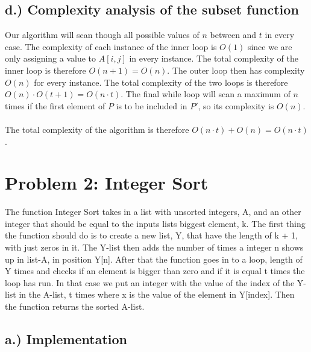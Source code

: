 \documentclass{article}
\begin{document}
\subsection*{d.) Complexity analysis of the subset function}
Our algorithm will scan though all possible values of $n$ between and $t$ in every case. The complexity of each instance of the inner loop is $O(1)$ since we are only assigning a value to $A[i,j]$ in every instance. The total complexity of the inner loop is therefore $O(n+1) = O(n)$.
The outer loop then has complexity $O(n)$ for every instance. The total complexity of the two loops is therefore $O(n)\cdot O(t+1) = O(n\cdot t)$. The final while loop will scan a maximum of $n$ times if the first element of $P$ is to be included in $P'$, so its complexity is $O(n)$. \\ \\The total complexity of the algorithm is therefore $O(n\cdot t) + O(n) = O(n\cdot t)$.
\section*{Problem 2: Integer Sort}
The function Integer Sort takes in a list with unsorted integers, A, and an other integer that should be equal to the inputs lists biggest element, k. The first thing the function should do is to create a new list, Y, that have the length of k + 1, with just zeros in it. The Y-list then adds the number of times a integer n shows up in list-A, in position Y[n]. After that the function goes in to a loop, length of Y times and checks if an element is bigger than zero and if it is equal t times the loop has run. In that case we put an integer with the value of the index of the Y-list in the A-list, t times where x is the value of the element in Y[index]. Then the function returns the sorted A-list.

\newpage
\subsection*{a.) Implementation}
\end{document}
